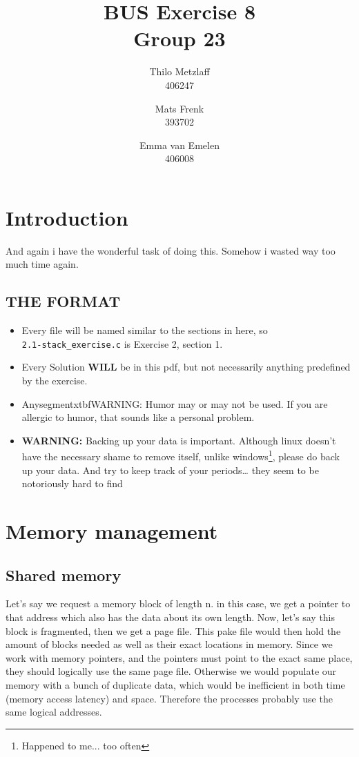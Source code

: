 \documentclass[a4paper, 11pt]{article}
\author{Thilo Metzlaff\\406247 \and Mats Frenk\\393702\and Emma van Emelen\\406008}
\title{BUS Exercise 8 \\ Group 23}
\begin{document}
    \maketitle
    \newpage

    \tableofcontents
    \newpage

    \section*{Introduction}
    And again i have the wonderful task of doing this. Somehow i wasted way too much time again. 

    \subsection*{THE FORMAT}
    \begin{itemize}
      \item Every file will be named similar to the sections in here, so\\
      \texttt{2.1-stack\_exercise.c} is Exercise 2, section 1.
      \item Every Solution \textbf{WILL} be in this pdf, but not necessarily 
            anything predefined by the exercise.
      \item Anysegmentxtbf{WARNING:} Humor may or may not be used. If you are allergic
            to humor, that sounds like a personal problem.
      \item \textbf{WARNING:} Backing up your data is important. Although linux 
            doesn't have the necessary shame to remove itself, unlike windows\footnote{Happened to me... too often},
            please do back up your data. And try to keep track of your periods\dots
            they seem to be notoriously hard to find
    \end{itemize}
    \newpage
    
    \section{Memory management}
    \subsection{Shared memory}
    Let's say we request a memory block of length n. in this case, we get a pointer to that address which also has the data about its own length. Now, let's say this block is fragmented, then we get a page file. 
    This pake file would then hold the amount of blocks needed as well as their exact locations in memory. Since we work with memory pointers, and the pointers must point to the exact same place, they should logically use the same page file.
    Otherwise we would populate our memory with a bunch of duplicate data, which would be inefficient in both time (memory access latency) and space. Therefore the processes probably use the same logical addresses.
    
\end{document}
